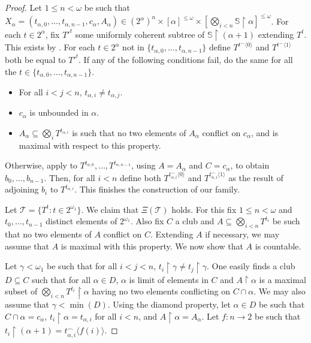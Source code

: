 \documentclass[a4paper,noamsfonts]{amsart}
\theoremstyle{definition}
\newcommand{\seb}{\subseteq}
\newcommand{\res}{\!\upharpoonright\!}
\newcommand{\tup}[1]{\langle#1\rangle}
\newcommand{\1}{\mathbf{1}}
\newcommand{\T}{\mathcal{T}}
\newcommand{\prop}{\Xi}
\renewcommand{\S}{\mathbb{S}}
\begin{document}
\begin{proof}
  Let $1 \le n < \omega$ be such that $X_{\alpha} =
  (t_{\alpha,0},\dots,t_{\alpha,n-1},c_{\alpha},A_{\alpha}) \in
  (2^{\alpha})^{n}\times [\alpha]^{\le\omega}\times
    [\bigotimes_{i <n} \S\res \alpha]^{\le\omega}$.
  For each $t \in 2^{\alpha}$, fix  ${T'}^{t}$
  some uniformly coherent
  subtree of $\S \res (\alpha+1)$ extending $T^{t}$. This exists
  by . For each $t \in 2^{\alpha}$ not in
  $\{t_{\alpha,0},\dots,t_{\alpha,n-1}\}$ define
  $T^{t^{\frown}\tup{0}}$ and $T^{t^{\frown}\tup{1}}$ both be equal
  to ${T'}^{t}$.  
  If any of the following conditions fail, do the
  same for all the $t \in \{t_{\alpha,0},\dots,t_{\alpha,n-1}\}$.
  \begin{itemize}
    \item For all $i < j < n$, $t_{\alpha,i} \neq t_{\alpha,j}$.
    \item $c_{\alpha}$ is unbounded in $\alpha$.
    \item $A_{\alpha} \seb \bigotimes_{i}T^{t_{\alpha,i}}$ is such that
    no two elements of $A_{\alpha}$ conflict on $c_{\alpha}$, and is maximal
    with respect to this property.
  \end{itemize}
  Otherwise, apply 
  to $T^{t_{\alpha,0}},\dots,T^{t_{\alpha,n-1}}$, using $A = A_{\alpha}$
  and $C = c_{\alpha}$,
  to obtain $b_{0},\dots,
  b_{n-1}$. Then, for all $i < n$ define
  both $T^{t_{\alpha,i}^{\frown}\tup{0}}$ and
  $T^{t_{\alpha,i}^{\frown}\tup{1}}$ as the result of adjoining
  $b_{i}$ to $T^{t_{\alpha,i}}$. This finishes the construction
  of our family.

  Let $\T = \{T^{t} : t \in 2^{\omega_{1}}\}$. We claim
  that $\prop(\T)$ holds. For this fix $1 \le n < \omega$
  and $t_{0},\dots,t_{n-1}$ distinct elements of $2^{\omega_{1}}$.
  Also fix $C$ a club and $A \seb \bigotimes_{i < n}T^{t_{i}}$
  be such that no two elements of $A$ conflict on $C$.
  Extending $A$ if necessary, we may assume that $A$ is maximal
  with this property. We now show that $A$ is countable.

  Let $\gamma < \omega_{1}$ be such that for all $i < j < n$,
  $t_{i}\res \gamma \neq t_{j}\res \gamma$. One easily finds
  a club $D \seb C$ such that for all $\alpha \in D$,
  $\alpha$ is limit of elements in $C$ and $A \res \alpha$ is a maximal
  subset of $\bigotimes_{i < n}T^{t_{i}}\res \alpha$ having
  no two elements conflicting on $C \cap \alpha$. We may
  also assume that $\gamma < \min(D)$. Using the
  diamond property, let $\alpha \in D$ be such that
  $C \cap \alpha = c_{\alpha}$, $t_{i}\res \alpha = t_{\alpha,i}$
  for all $i < n$, and $A \res \alpha = A_{\alpha}$. Let
  $f : n \to 2$ be such that $t_{i}\res(\alpha+1) = t_{\alpha,i}^{\frown}
  \tup{f(i)}$.


\end{proof}
\end{document}
